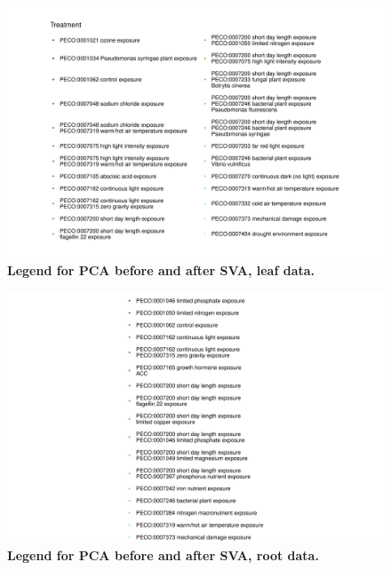 \documentclass[12pt]{article}
\begin{document}
\begin{figure}[H]
\centering
\includegraphics[width = \linewidth]{figures/appendix_a/pca_beforeAndAfterSva_leaf_legend_2023-02-21.pdf}
\caption{\textbf{Legend for PCA before and after SVA, leaf data.}}%
\label{fig::pcaLegendLeaf}
\end{figure}

\begin{figure}[H]
\centering
\includegraphics[width = \linewidth]{figures/appendix_a/pca_beforeAndAfterSva_root_legend_2023-02-21.pdf}
\caption{\textbf{Legend for PCA before and after SVA, root data.}}%
\label{fig::pcaLegendRoot}
\end{figure}
\end{document}
